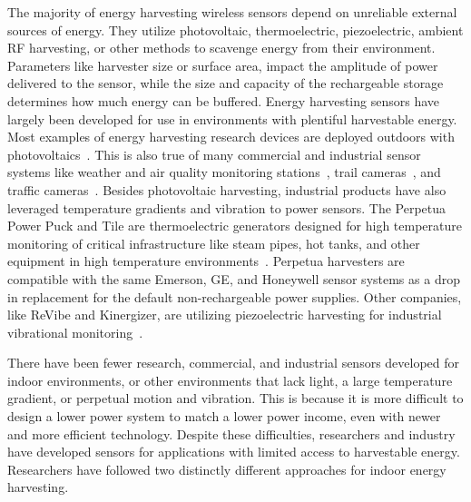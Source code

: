 The majority of energy harvesting wireless sensors depend on unreliable external sources of energy.
They utilize photovoltaic, thermoelectric, piezoelectric, ambient RF harvesting, or other methods to scavenge energy from their environment.
Parameters like harvester size or surface area, impact the amplitude of power delivered to the sensor,
while the size and capacity of the rechargeable storage determines how much energy can be buffered.
Energy harvesting sensors
have largely been developed for use in environments with plentiful harvestable energy.
Most examples of energy harvesting research devices are deployed outdoors with photovoltaics~\cite{jiang2005perpetual, kansal2007power, corke2007long, lin2005heliomote, taneja2008design, adkins2018signpost}.
This is also true of many commercial and industrial sensor systems like weather and air quality monitoring stations~\cite{davis_weather}, trail cameras~\cite{spypoint_camera}, and traffic cameras~\cite{wanco_traffic}.
Besides photovoltaic harvesting, industrial products have also leveraged temperature gradients and vibration to power sensors. The Perpetua Power Puck and Tile are thermoelectric generators designed for high temperature monitoring of critical infrastructure like steam pipes, hot tanks, and other equipment in high temperature environments~\cite{perpetua}.
Perpetua harvesters are compatible with the same Emerson, GE, and Honeywell sensor systems as a drop in replacement for the default non-rechargeable power supplies. Other companies, like ReVibe and Kinergizer, are utilizing piezoelectric harvesting for industrial vibrational monitoring~\cite{revibe,kinergizer}.

There have been fewer research, commercial, and industrial sensors developed for indoor environments, or other environments that lack light, a large temperature gradient, or perpetual motion and vibration.
This is because it is more difficult to design a lower power system to match a lower power income, even with newer and more efficient technology.
Despite these difficulties, researchers and industry have developed sensors for applications with limited access to harvestable energy.
Researchers have followed two distinctly different approaches for indoor energy harvesting.

